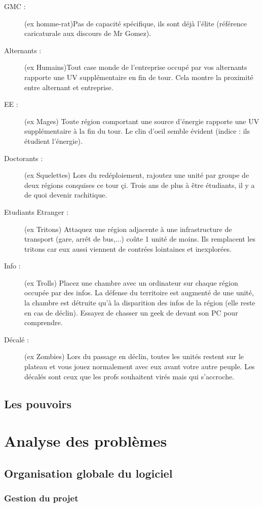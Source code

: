 \documentclass[11pt]{report}
\begin{document}
\begin{description}
		\item[GMC :] (ex homme-rat)Pas de capacité spécifique, ils sont déjà l'élite (référence caricaturale aux discours de Mr Gomez).
		\item[Alternants :] (ex Humains)Tout case monde de l'entreprise occupé par vos alternants rapporte une UV supplémentaire en fin de tour. Cela montre la proximité entre alternant et entreprise.
		\item[EE : ] (ex Mages) Toute région comportant une source d'énergie rapporte une UV supplémentaire à la fin du tour. Le clin d'oeil semble évident (indice : ils étudient l'énergie).
		\item[Doctorants :] (ex Squelettes) Lors du redéploiement, rajoutez une unité par groupe de deux régions conquises ce tour çi. Trois ans de plus à être étudiants, il y a de quoi devenir rachitique.
		\item[Etudiants Etranger :] (ex Tritons) Attaquez une région adjacente à une infrastructure de transport (gare, arrêt de bus,...) coûte 1 unité de moins. Ils remplacent les tritons car eux aussi viennent de contrées lointaines et inexplorées.
		\item[Info :] (ex Trolls) Placez une chambre avec un ordinateur sur chaque région occupée par des infos. La défense du territoire est augmenté de une unité, la chambre est détruite qu'à la disparition des infos de la région (elle reste en cas de déclin). Essayez de chasser un geek de devant son PC pour comprendre.
		\item[Décalé :] (ex Zombies) Lors du passage en déclin, toutes les unités restent sur le plateau et vous jouez normalement avec eux avant votre autre peuple. Les décalés sont ceux que les profs souhaitent virés mais qui s'accroche.
	\end{description}

	\section{Les pouvoirs}

\chapter{Analyse des problèmes}

	\section{Organisation globale du logiciel}

		\subsection{Gestion du projet}
\end{document}
